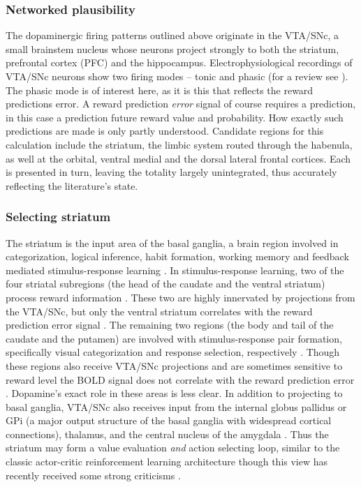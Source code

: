 \subsubsection{Networked plausibility}
\label{subsub:plausibility}
The dopaminergic firing patterns outlined above originate in the VTA/SNc, a small brainstem nucleus whose neurons project strongly to both the striatum, prefrontal cortex (PFC) and the hippocampus.  Electrophysiological recordings of VTA/SNc neurons show two firing modes -- tonic and phasic (for a review see ).  The phasic mode is of interest here, as it is this that reflects the reward predictions error.  A reward prediction \emph{error} signal of course requires a prediction, in this case a prediction future reward value and probability.  How exactly such predictions are made is only partly understood.  Candidate regions for this calculation include the striatum, the limbic system routed through the habenula, as well at the orbital, ventral medial and the dorsal lateral frontal cortices.  Each is presented in turn, leaving the totality largely unintegrated, thus accurately reflecting the literature's state.

\subsubsection{Selecting striatum}
\label{subsub:selstr}
The striatum is the input area of the basal ganglia, a brain region involved in categorization, logical inference, habit formation, working memory and feedback mediated stimulus-response learning \cite{Frank:2001p1996,Jin:2010p7199,SchmitzerTorbert:2004p5410,Seger:2008p6401,Seger:2010p7189,Yin:2006p5080}.  In stimulus-response learning, two of the four striatal subregions (the head of the caudate and the ventral striatum) process reward information \cite{Yin:2005p5101,Yin:2008p6347,Schonberg:2009p6669}.  These two are highly innervated by projections from the VTA/SNc, but only the ventral striatum correlates with the reward prediction error signal \cite{Haruno:2006p3979,Seger:2010p7189}.  The remaining two regions (the body and tail of the caudate and the putamen) are involved with stimulus-response pair formation, specifically visual categorization and response selection, respectively \cite{Seger:2008p6401,Seger:2010p7189}.  Though these regions also receive VTA/SNc projections and are sometimes sensitive to reward level \cite{BischoffGrethe:2009p4570} the BOLD signal does not correlate with the reward prediction error \cite{Seger:2010p7189}.  Dopamine's exact role in these areas is less clear.  In addition to projecting to basal ganglia, VTA/SNc also receives input from the internal globus pallidus or GPi (a major output structure of the basal ganglia with widespread cortical connections), thalamus, and the central nucleus of the amygdala \cite{Botvinick:2008p6594}.   Thus the striatum may form a value evaluation \emph{and} action selecting loop, similar to the classic actor-critic reinforcement learning architecture \cite{Bornstein:2011p7996,Ito:2011p8146} though this view has recently received some strong criticisms \cite{Joel:2002p6593}.

